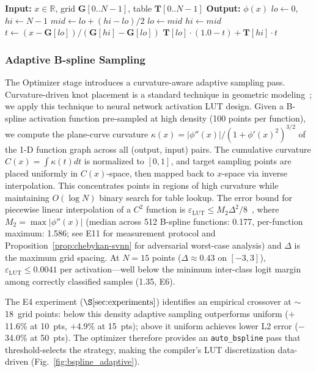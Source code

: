 \documentclass[journal,onecolumn]{IEEEtran}
\begin{document}
\begin{algorithm}[t]
\caption{B-spline Evaluation via Lookup Table (SCL: FC2)}
\label{alg:bspline}
\begin{algorithmic}[1]
\State \textbf{Input:} $x \in \mathbb{R}$, grid $\mathbf{G}[0..N-1]$, table $\mathbf{T}[0..N-1]$
\State \textbf{Output:} $\phi(x)$
\State $lo \gets 0$, $hi \gets N-1$
    \State $mid \gets lo + (hi - lo) / 2$
     $lo \gets mid$ \Else $hi \gets mid$ \EndIf
\EndWhile
\State $t \gets (x - \mathbf{G}[lo]) / (\mathbf{G}[hi] - \mathbf{G}[lo])$
\State \Return $\mathbf{T}[lo] \cdot (1.0 - t) + \mathbf{T}[hi] \cdot t$
\end{algorithmic}
\end{algorithm}

\subsubsection{Adaptive B-spline Sampling}

The Optimizer stage introduces a curvature-aware adaptive sampling pass.
Curvature-driven knot placement is a standard technique in geometric
modeling~\cite{li2005adaptive}; we apply this technique to neural network
activation LUT design. Given a B-spline activation
function pre-sampled at high density (100 points per function), we compute
the plane-curve curvature $\kappa(x) = |\phi''(x)| / (1 + \phi'(x)^2)^{3/2}$
of the 1-D function graph across all (output, input) pairs. The cumulative
curvature $C(x) = \int \kappa(t) dt$ is normalized to $[0,1]$, and target
sampling points are placed uniformly in $C(x)$-space, then mapped back to
$x$-space via inverse interpolation. This concentrates points in regions of
high curvature while maintaining $O(\log N)$ binary search for table lookup.
The error bound for piecewise linear interpolation of a $C^2$ function is
$\varepsilon_{\text{LUT}} \leq M_2 \Delta^2 / 8$~\cite{deBoor1978,piegl1997nurbs}, where
$M_2 = \max |\phi''(x)|$ (median across 512 B-spline functions: 0.177,
per-function maximum: 1.586; see E11 for measurement protocol and
Proposition~\ref{prop:chebykan-svnn} for adversarial worst-case analysis)
and $\Delta$ is the maximum grid spacing.
At $N=15$ points ($\Delta \approx 0.43$ on $[-3,3]$), $\varepsilon_{\text{LUT}}
\leq 0.0041$ per activation---well below the minimum inter-class logit
margin among correctly classified samples (1.35, E6).

The E4 experiment ($\S\ref{sec:experiments}$) identifies an empirical crossover at
$\sim$18~grid points: below this density adaptive sampling outperforms uniform
($+$11.6\% at 10~pts, $+$4.9\% at 15~pts); above it uniform achieves lower
L2 error ($-$34.0\% at 50~pts). The optimizer therefore provides an
\texttt{auto\_bspline} pass that threshold-selects the strategy, making the
compiler's LUT discretization data-driven (Fig.~\ref{fig:bspline_adaptive}).
\end{document}
